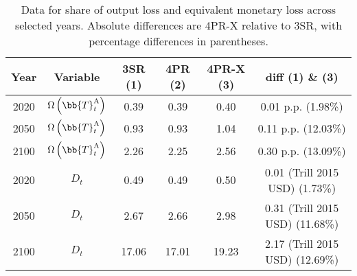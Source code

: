 \begin{table}[ht]
    \centering
    \begin{tabular}{c|c|c|c|c|c}
        \toprule
        Year & Variable & 3SR (1) & 4PR (2) & 4PR-X (3) & diff (1) \& (3) \\
        \midrule
        2020 & $\Omega\left(\bb{T}^{\text{A}}_{t}\right)$ & 0.39 & 0.39 & 0.40 & 0.01 p.p. (1.98\%) \\
        2050 & $\Omega\left(\bb{T}^{\text{A}}_{t}\right)$ & 0.93 & 0.93 & 1.04 & 0.11 p.p. (12.03\%) \\
        2100 & $\Omega\left(\bb{T}^{\text{A}}_{t}\right)$ & 2.26 & 2.25 & 2.56 & 0.30 p.p. (13.09\%) \\
        \hline
        2020 & $D_t$ & 0.49 & 0.49 & 0.50 & 0.01 (Trill 2015 USD) (1.73\%) \\
        2050 & $D_t$ & 2.67 & 2.66 & 2.98 & 0.31 (Trill 2015 USD) (11.68\%) \\
        2100 & $D_t$ & 17.06 & 17.01 & 19.23 & 2.17 (Trill 2015 USD) (12.69\%) \\
        \bottomrule
    \end{tabular}
     \caption{Data for share of output loss and equivalent monetary loss across selected years. Absolute differences are 4PR-X relative to 3SR, with percentage differences in parentheses.}
    \label{tab:dam}
\end{table}